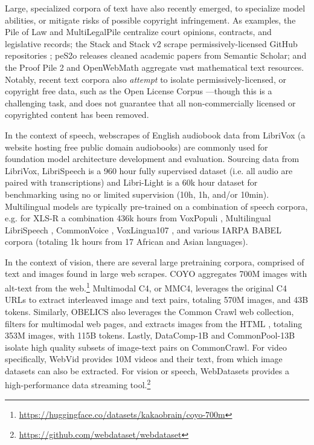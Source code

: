 Large, specialized corpora of text have also recently emerged, to specialize model abilities, or mitigate risks of possible copyright infringement.
As examples, the Pile of Law \citep{henderson2022pile} and MultiLegalPile \citep{niklaus2023multilegalpile} centralize court opinions, contracts, and legislative records; the Stack and Stack v2 scrape permissively-licensed GitHub repositories \citep{kocetkov2022stack}; peS2o \citep{lo2020s2orc} releases cleaned academic papers from Semantic Scholar; and the Proof Pile 2 \citep{azerbayev2023llemma} and OpenWebMath \citep{paster2023openwebmath} aggregate vast mathematical text resources.
Notably, recent text corpora also \emph{attempt} to isolate permissively-licensed, or copyright free data, such as the Open License Corpus \citep{min2023SILOLM}---though this is a challenging task, and does not guarantee that all non-commercially licensed or copyrighted content has been removed.

In the context of speech, webscrapes of English audiobook data from LibriVox (a website hosting free public domain audiobooks) are commonly used for foundation model architecture development and evaluation. Sourcing data from LibriVox, LibriSpeech \citep{panayotov2015librispeech} is a 960 hour fully supervised dataset (i.e. all audio are paired with transcriptions) and Libri-Light \citep{kahn2020libri} is a 60k hour dataset for benchmarking using no or limited supervision (10h, 1h, and/or 10min). Multilingual models are typically pre-trained on a combination of speech corpora, e.g. for XLS-R \citep{babu22-interspeech} a combination 436k hours from VoxPopuli \citep[400k hours from 23 languages based on European Parliament recordings:][]{wang2021voxpopuli}, Multilingual LibriSpeech \citep[50k hours of audiobooks from 8 languages][]{pratap20-interspeech}, CommonVoice \citep[28k hours of crowd-sourced read speech from 100+ languages][]{ardila-etal-2020-common}, VoxLingua107 \citep[6.6k hours from 107 languages scraped from YouTube][]{valk2021voxlingua107}, and various IARPA BABEL corpora (totaling 1k hours from 17 African and Asian languages).

In the context of vision, there are several large pretraining corpora, comprised of text and images found in large web scrapes.
COYO aggregates 700M images with alt-text from the web.\footnote{\url{https://huggingface.co/datasets/kakaobrain/coyo-700m}}
Multimodal C4, or MMC4, \citep{zhu2024multimodal} leverages the original C4 URLs to extract interleaved image and text pairs, totaling 570M images, and 43B tokens.
Similarly, OBELICS also leverages the Common Crawl web collection, filters for multimodal web pages, and extracts images from the HTML \citep{laurenccon2024obelics}, totaling 353M images, with 115B tokens.
Lastly, DataComp-1B and CommonPool-13B \citep{gadre2024datacomp} isolate high quality subsets of image-text pairs on CommonCrawl.
For video specifically, WebVid \citep{bain2021frozen} provides 10M videos and their text, from which image datasets can also be extracted.
For vision or speech, WebDatasets provides a high-performance data streaming tool.\footnote{\url{https://github.com/webdataset/webdataset}}



